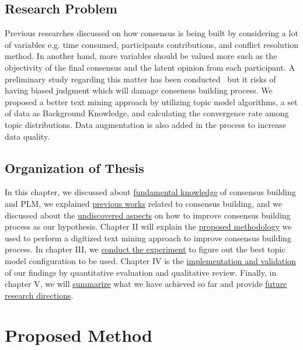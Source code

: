\documentclass[senior]{IPSstyle}
\begin{document}
\section{Research Problem}

Previous researches discussed on how consensus is being built by considering a lot of variables e.g. time consumed, participants contributions, and conflict resolution method. In another hand, more variables should be valued more such as the objectivity of the final consensus and the latent opinion from each participant. A preliminary study regarding this matter has been conducted~\cite{goto2} but it risks of having biased judgment which will damage consensus building process. We proposed a better text mining approach by utilizing topic model algorithms, a set of data as Background Knowledge, and calculating the convergence rate among topic distributions. Data augmentation is also added in the process to increase data quality.

\section{Organization of Thesis}

In this chapter, we discussed about \underline{fundamental knowledge} of consensus building and PLM, we explained \underline{previous works} related to consensus building, and we discussed about the \underline{undiscovered aspects} on how to improve consensus building process as our hypothesis. Chapter II will explain the \underline{proposed methodology} we used to perform a digitized text mining approach to improve consensus building process. In chapter III, we \underline{conduct the experiment} to figure out the best topic model configuration to be used. Chapter IV is the \underline{implementation and validation} of our findings by quantitative evaluation and qualitative review. Finally, in chapter V, we will \underline{summarize} what we have achieved so far and provide \underline{future research directions}.

\chapter{Proposed Method} 
\end{document}
